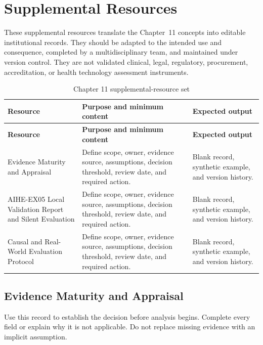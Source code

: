 \section{Supplemental Resources}
\label{sec:comp-ch11-supplemental}

These supplemental resources translate the Chapter~11 concepts into editable
institutional records. They should be adapted to the intended use and consequence,
completed by a multidisciplinary team, and maintained under version control. They
are not validated clinical, legal, regulatory, procurement, accreditation, or health
technology assessment instruments.

\begin{longtable}{@{}p{}p{}p{}@{}}
\caption{Chapter 11 supplemental-resource set}
\label{tab:comp-ch11-supplemental-set}\\
\toprule
\textbf{Resource} & \textbf{Purpose and minimum content} & \textbf{Expected output} \\
\midrule
\endfirsthead
\toprule
\textbf{Resource} & \textbf{Purpose and minimum content} & \textbf{Expected output} \\
\midrule
\endhead
\bottomrule
\endlastfoot
Evidence Maturity and Appraisal & Define scope, owner, evidence source, assumptions, decision threshold, review date, and required action. & Blank record, synthetic example, and version history. \\
AIHE-EX05 Local Validation Report and Silent Evaluation & Define scope, owner, evidence source, assumptions, decision threshold, review date, and required action. & Blank record, synthetic example, and version history. \\
Causal and Real-World Evaluation Protocol & Define scope, owner, evidence source, assumptions, decision threshold, review date, and required action. & Blank record, synthetic example, and version history. \\
\end{longtable}

\subsection{Evidence Maturity and Appraisal}
\label{sec:comp-ch11-supp-1}
Use this record to establish the decision before analysis begins. Complete every
field or explain why it is not applicable. Do not replace missing evidence with an
implicit assumption.


